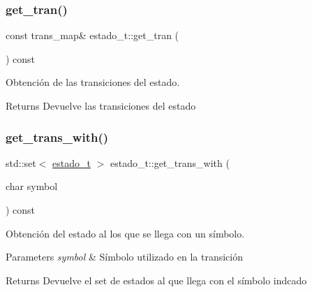 \subsubsection{\texorpdfstring{get\+\_\+tran()}{get\_tran()}}
{\footnotesize\ttfamily const trans\+\_\+map\& estado\+\_\+t\+::get\+\_\+tran (\begin{DoxyParamCaption}{ }\end{DoxyParamCaption}) const\hspace{0.3cm}{\ttfamily [inline]}}



Obtención de las transiciones del estado. 

\begin{DoxyReturn}{Returns}
Devuelve las transiciones del estado 
\end{DoxyReturn}
\mbox{\label{classestado__t_af72252b5733a1b673b44f699a46f7491}} 
\subsubsection{\texorpdfstring{get\+\_\+trans\+\_\+with()}{get\_trans\_with()}}
{\footnotesize\ttfamily std\+::set$<$ \hyperlink{classestado__t}{estado\+\_\+t} $>$ estado\+\_\+t\+::get\+\_\+trans\+\_\+with (\begin{DoxyParamCaption}\item[{char}]{symbol }\end{DoxyParamCaption}) const}



Obtención del estado al los que se llega con un símbolo. 


\begin{DoxyParams}{Parameters}
{\em symbol} & Símbolo utilizado en la transición \\
\hline
\end{DoxyParams}
\begin{DoxyReturn}{Returns}
Devuelve el set de estados al que llega con el símbolo indcado 
\end{DoxyReturn}
\mbox{\label{classestado__t_a96d95f170a07bf03280f4884329ab91c}} 
